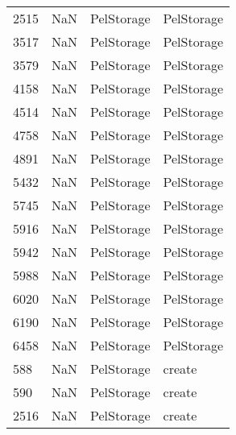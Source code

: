 \begin{tabular}{llll}
2515 &                   NaN &                 PelStorage &                                PelStorage \\
3517 &                   NaN &                 PelStorage &                                PelStorage \\
3579 &                   NaN &                 PelStorage &                                PelStorage \\
4158 &                   NaN &                 PelStorage &                                PelStorage \\
4514 &                   NaN &                 PelStorage &                                PelStorage \\
4758 &                   NaN &                 PelStorage &                                PelStorage \\
4891 &                   NaN &                 PelStorage &                                PelStorage \\
5432 &                   NaN &                 PelStorage &                                PelStorage \\
5745 &                   NaN &                 PelStorage &                                PelStorage \\
5916 &                   NaN &                 PelStorage &                                PelStorage \\
5942 &                   NaN &                 PelStorage &                                PelStorage \\
5988 &                   NaN &                 PelStorage &                                PelStorage \\
6020 &                   NaN &                 PelStorage &                                PelStorage \\
6190 &                   NaN &                 PelStorage &                                PelStorage \\
6458 &                   NaN &                 PelStorage &                                PelStorage \\
588  &                   NaN &                 PelStorage &                                    create \\
590  &                   NaN &                 PelStorage &                                    create \\
2516 &                   NaN &                 PelStorage &                                    create \\

\end{tabular}
